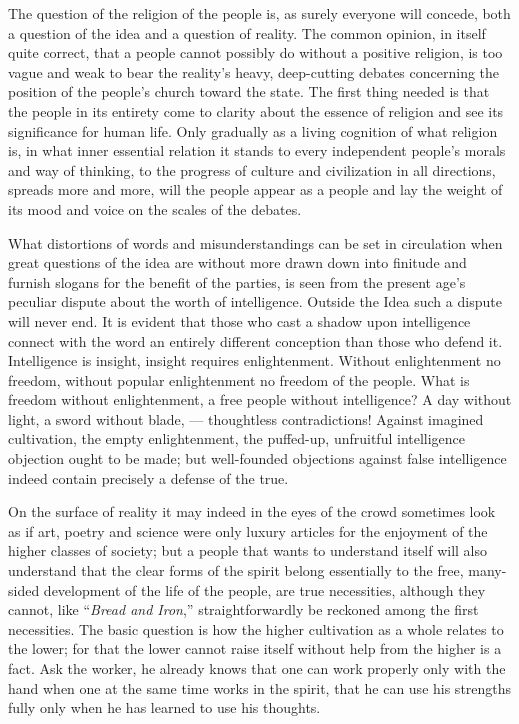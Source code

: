 \documentclass[12pt,a4paper,openany]{book}
\newcommand{\opage}[1]{\marginnote{\footnotesize\textit{[#1]}}}
\begin{document}
The question of the religion of the people is, as surely everyone
will concede, both a question of the idea and a question of reality.
The common opinion, in itself quite
correct, that a people cannot possibly do without a positive
religion, is too vague and weak to bear the reality's
heavy, deep-cutting debates concerning
the position of the people's church toward the state. The first thing needed
is that the people in its entirety come to clarity about the essence of religion
and see its significance for human life.
Only gradually as a living cognition
of what religion is, in what inner essential relation
it stands to every independent people's morals and way of thinking,
to the progress of culture and civilization in all
directions, spreads more and more, will the people appear
as a people and lay the weight of its mood and voice
on the scales of the debates.

What distortions of words and misunderstandings can be
set in circulation when great questions of the idea are without more
drawn down into finitude and furnish slogans for the benefit
of the parties, is seen from the present age's peculiar dispute about
the worth of intelligence. Outside the Idea such a dispute will
never end. It is evident that those who cast a shadow
upon intelligence connect with the word an entirely different
conception than those who defend it. Intelligence is
insight, insight requires enlightenment. Without enlightenment
\setcounter{footnote}{0}%
\opage{38}no freedom, without popular enlightenment no freedom of the people.
What is freedom without enlightenment, a free people without
intelligence? A day without light, a sword without blade, ---
thoughtless contradictions! Against imagined cultivation, the
empty enlightenment, the puffed-up, unfruitful intelligence
objection ought to be made; but well-founded objections
against false intelligence indeed contain precisely a defense
of the true.

On the surface of reality it may indeed in the eyes of the crowd
sometimes look as if art, poetry and
science were only luxury articles for the enjoyment of the
higher classes of society; but a people that wants to understand
itself will also understand that the clear forms of the spirit
belong essentially to the free, many-sided development of the life of the people,
are true necessities, although they cannot, like
``\emph{Bread and Iron},'' straightforwardly be reckoned among the first
necessities. The basic question is how the
higher cultivation as a whole relates to the lower;
for that the lower cannot raise itself without help from the
higher is a fact. Ask the worker, he
already knows that one can work properly only
with the hand when one at the same time works in the spirit, that
he can use his strengths fully only when he has
learned to use his thoughts.
\end{document}
